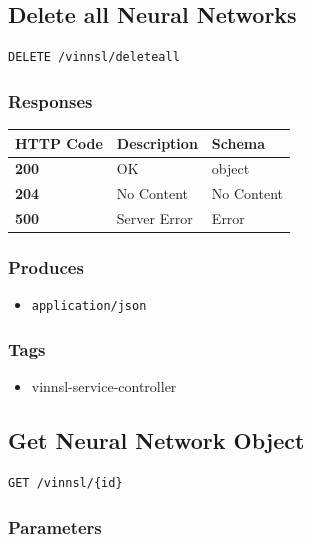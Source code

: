 \subsection{Delete all Neural
Networks}\label{delete-all-neural-networks}

\begin{verbatim}
DELETE /vinnsl/deleteall
\end{verbatim}

\subsubsection{Responses}\label{responses-2}

\begin{longtable}[]{@{}lll@{}}
\toprule
HTTP Code & Description & Schema\tabularnewline
\midrule
\endhead
\textbf{200} & OK & object\tabularnewline
\textbf{204} & No Content & No Content\tabularnewline
\textbf{500} & Server Error & Error\tabularnewline
\bottomrule
\end{longtable}

\subsubsection{Produces}\label{produces-2}

\begin{itemize}
\tightlist
\item
  \texttt{application/json}
\end{itemize}

\subsubsection{Tags}\label{tags-2}

\begin{itemize}
\tightlist
\item
  vinnsl-service-controller
\end{itemize}

\subsection{Get Neural Network Object}\label{get-neural-network-object}

\begin{verbatim}
GET /vinnsl/{id}
\end{verbatim}

\subsubsection{Parameters}\label{parameters-1}

